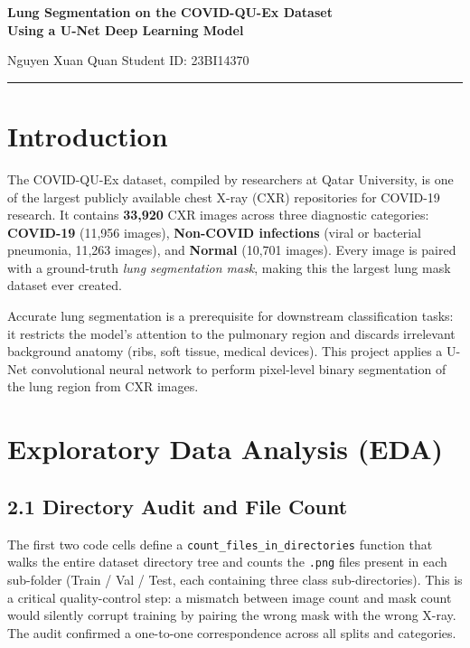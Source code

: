 \documentclass[12pt,a4paper]{article}
\begin{document}
\begin{center}
  {\LARGE\bfseries Lung Segmentation on the COVID-QU-Ex Dataset\\[4pt]
  Using a U-Net Deep Learning Model\par}
  \vspace{0.5cm}
  {\large Nguyen Xuan Quan \quad Student ID: 23BI14370\par}
\end{center}
\vspace{0.4cm}\hrule\vspace{0.4cm}

\section{Introduction}

The COVID-QU-Ex dataset, compiled by researchers at Qatar University, is one of
the largest publicly available chest X-ray (CXR) repositories for COVID-19
research. It contains \textbf{33,920} CXR images across three diagnostic
categories: \textbf{COVID-19} (11,956 images), \textbf{Non-COVID infections}
(viral or bacterial pneumonia, 11,263 images), and \textbf{Normal} (10,701
images). Every image is paired with a ground-truth \emph{lung segmentation mask},
making this the largest lung mask dataset ever created.

Accurate lung segmentation is a prerequisite for downstream classification tasks:
it restricts the model's attention to the pulmonary region and discards irrelevant
background anatomy (ribs, soft tissue, medical devices). This project applies a
U-Net convolutional neural network to perform pixel-level binary segmentation of
the lung region from CXR images.

\section{Exploratory Data Analysis (EDA)}

\subsection*{2.1 Directory Audit and File Count}

The first two code cells define a \texttt{count\_files\_in\_directories} function
that walks the entire dataset directory tree and counts the \texttt{.png} files
present in each sub-folder (Train / Val / Test, each containing three class
sub-directories). This is a critical quality-control step: a mismatch between
image count and mask count would silently corrupt training by pairing the wrong
mask with the wrong X-ray. The audit confirmed a one-to-one correspondence across
all splits and categories.
\end{document}
